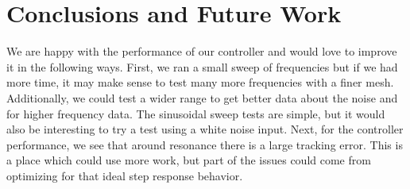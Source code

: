 \documentclass[11pt]{article}
\begin{document}
\section{Conclusions and Future Work}
We are happy with the performance of our controller and would love to improve it in the following ways. First, we ran a small sweep of frequencies but if we had more time, it may make sense to test many more frequencies with a finer mesh. Additionally, we could test a wider range to get better data about the noise and for higher frequency data. The sinusoidal sweep tests are simple, but it would also be interesting to try a test using a white noise input. 
Next, for the controller performance, we see that around resonance there is a large tracking error. This is a place which could use more work, but part of the issues could come from optimizing for that ideal step response behavior. 

\begin{thebibliography}{9}
\end{thebibliography}
\end{document}
